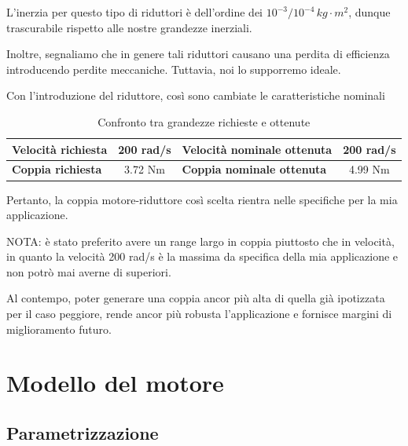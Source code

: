 \documentclass[a4paper,12pt]{article}
\begin{document}
L'inerzia per questo tipo di riduttori è dell'ordine dei $10^{-3}/10^{-4}\,kg \cdot m^2$, dunque trascurabile rispetto alle nostre grandezze inerziali.

\vspace{0.5cm}

Inoltre, segnaliamo che in genere tali riduttori causano una perdita di efficienza introducendo perdite meccaniche. Tuttavia, noi lo supporremo ideale.

\vspace{0.5cm}
Con l'introduzione del riduttore, così sono cambiate le caratteristiche nominali 

\begin{table}[h!]
    \centering
    \begin{tabular}{|l|c|l|c|}
    \hline
    \textbf{Velocità richiesta} & 200 rad/s & \textbf{Velocità nominale ottenuta} & 200 rad/s \\ \hline
    \textbf{Coppia richiesta}  &  3.72 Nm  & \textbf{Coppia nominale ottenuta}   & 4.99 Nm              \\ \hline
    \end{tabular}
    \caption{Confronto tra grandezze richieste e ottenute}
\end{table}

\vspace{0.3cm}

Pertanto, la coppia motore-riduttore così scelta rientra nelle specifiche per la mia applicazione.

\vspace{0.5cm}

NOTA: è stato preferito avere un range largo in coppia piuttosto che in velocità, in quanto la velocità 200 rad/s è la massima da specifica della mia applicazione e non potrò mai averne di superiori.

Al contempo, poter generare una coppia ancor più alta di quella già ipotizzata per il caso peggiore, rende ancor più robusta l'applicazione e fornisce margini di miglioramento futuro.

\newpage

\section{Modello del motore}

\subsection{Parametrizzazione}
\end{document}
